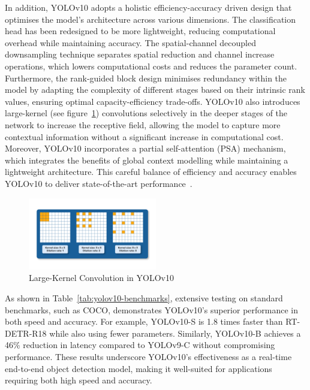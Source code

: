 \documentclass[12pt,oneside]{book} %
\begin{document}
\noindent In addition, YOLOv10 adopts a holistic efficiency-accuracy driven design that
optimises the model’s architecture across various dimensions. The
classification head has been redesigned to be more lightweight, reducing
computational overhead while maintaining accuracy. The spatial-channel
decoupled downsampling technique separates spatial reduction and channel
increase operations, which lowers computational costs and reduces the parameter
count. Furthermore, the rank-guided block design minimises redundancy within
the model by adapting the complexity of different stages based on their
intrinsic rank values, ensuring optimal capacity-efficiency trade-offs. YOLOv10
also introduces large-kernel (see figure~\ref{fig:large-kernel-yolov10})
convolutions selectively in the deeper stages of the network to increase the
receptive field, allowing the model to capture more contextual information
without a significant increase in computational cost. Moreover, YOLOv10
incorporates a partial self-attention (PSA) mechanism, which integrates the
benefits of global context modelling while maintaining a lightweight
architecture. This careful balance of efficiency and accuracy enables YOLOv10
to deliver state-of-the-art
performance~\cite{wang2024yolov10,LearnOpenCVYOLOv10}.

\begin{figure}[H]
    \centering
    \includegraphics[width=0.5\textwidth]{figures/KernelYOLOv10.png}
    \caption{Large-Kernel Convolution in YOLOv10~\cite{LearnOpenCVYOLOv10}}\label{fig:large-kernel-yolov10}
\end{figure}

\noindent As shown in Table~\ref{tab:yolov10-benchmarks}, extensive testing on standard
benchmarks, such as COCO, demonstrates YOLOv10’s superior performance in both
speed and accuracy. For example, YOLOv10-S is 1.8 times faster than RT-DETR-R18
while also using fewer parameters. Similarly, YOLOv10-B achieves a 46\%
reduction in latency compared to YOLOv9-C without compromising performance.
These results underscore YOLOv10’s effectiveness as a real-time end-to-end
object detection model, making it well-suited for applications requiring both
high speed and accuracy.
\end{document}
